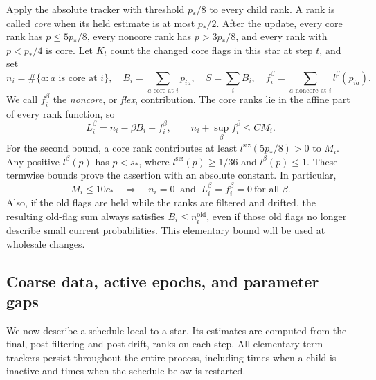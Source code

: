 Apply the absolute tracker with threshold $p_*/8$ to every child rank.
A rank is called \emph{core} when its held estimate is at most $p_*/2$.
After the update, every core rank has $p\le5p_*/8$, every noncore
rank has $p>3p_*/8$, and every rank with $p<p_*/4$ is core.
Let $K_t$ count the changed core flags in this star at step $t$, and set
\begin{equation}\label{eq:core-data}
 n_i=\#\{a:\text{$a$ is core at $i$}\},\quad
 B_i=\sum_{a\text{ core at }i}p_{ia},\quad
 S=\sum_iB_i,\quad
 f_i^\beta=\sum_{a\text{ noncore at }i}l^\beta(p_{ia}).
\end{equation}
We call \(f_i^\beta\) the \emph{noncore}, or \emph{flex}, contribution.
The core ranks lie in the affine part of every rank function, so
\begin{equation}\label{eq:core-decomposition}
 L_i^\beta=n_i-\beta B_i+f_i^\beta,\qquad
       n_i+\sup_\beta f_i^\beta\le C M_i.
\end{equation}
For the second bound, a core rank contributes at least
$l^{\mathrm{siz}}(5p_*/8)>0$ to $M_i$.  Any positive $l^\beta(p)$
has $p<s_*$, where $l^{\mathrm{siz}}(p)\ge1/36$ and $l^\beta(p)\le1$.
These termwise bounds prove the assertion with an absolute constant.
In particular,
\begin{equation}\label{eq:inactive-rank-vanishing}
 M_i\le10c_*\quad\Longrightarrow\quad
 n_i=0\ \text{ and }\ L_i^\beta=f_i^\beta=0\ \text{for all $\beta$}.
\end{equation}
Also, if the old flags are held while the ranks are filtered and drifted,
the resulting old-flag sum always satisfies $B_i\le n_i^{\mathrm{old}}$,
even if those old flags no longer describe small current probabilities.
This elementary bound will be used at wholesale changes.

\subsection{Coarse data, active epochs, and parameter gaps}

We now describe a schedule local to a star.  Its estimates are computed
from the final, post-filtering and post-drift, ranks on each step.
All elementary term trackers persist throughout the entire process,
including times when a child is inactive and times when the schedule
below is restarted.

